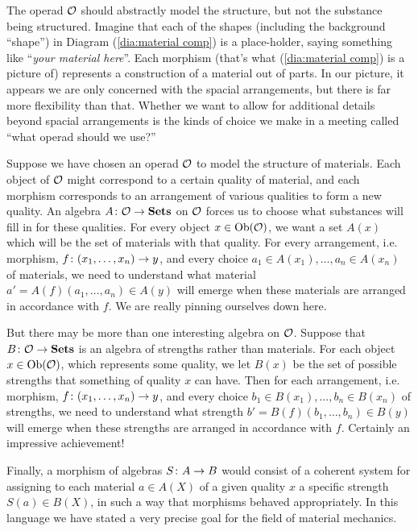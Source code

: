 \documentclass[CT4S-EN-RU]{subfiles}
\begin{document}
\begin{applicationENG}
The operad $\mathcal{O}$ should abstractly model the structure, but not the substance being structured. Imagine that each of the shapes (including the background “shape”) in Diagram (\ref{dia:material comp}) is a place-holder, saying something like “{\em your material here}”. Each morphism (that's what (\ref{dia:material comp}) is a picture of) represents a construction of a material out of parts. In our picture, it appears we are only concerned with the spacial arrangements, but there is far more flexibility than that. Whether we want to allow for additional details beyond spacial arrangements is the kinds of choice we make in a meeting called “what operad should we use?” 
\end{applicationENG}

\begin{applicationRUS}
\end{applicationRUS}

\begin{applicationENG}
Suppose we have chosen an operad $\mathcal{O}$ to model the structure of materials. Each object of $\mathcal{O}$ might correspond to a certain quality of material, and each morphism corresponds to an arrangement of various qualities to form a new quality. An algebra $A\colon\mathcal{O}\rightarrow{\mathbf{Sets}}$ on $\mathcal{O}$ forces us to choose what substances will fill in for these qualities. For every object $x\in\textnormal{Ob}(\mathcal{O})$, we want a set $A(x)$ which will be the set of materials with that quality. For every arrangement, i.e. morphism, $f\colon (x_1,\ldots,x_n)\rightarrow y$, and every choice $a_1\in A(x_1), \ldots, a_n\in A(x_n)$ of materials, we need to understand what material $a'=A(f)(a_1,\ldots,a_n)\in A(y)$ will emerge when these materials are arranged in accordance with $f$. We are really pinning ourselves down here.

But there may be more than one interesting algebra on $\mathcal{O}$. Suppose that $B\colon\mathcal{O}\rightarrow{\mathbf{Sets}}$ is an algebra of strengths rather than materials. For each object $x\in\textnormal{Ob}(\mathcal{O})$, which represents some quality, we let $B(x)$ be the set of possible strengths that something of quality $x$ can have. Then for each arrangement, i.e. morphism, $f\colon (x_1,\ldots,x_n)\rightarrow y$, and every choice $b_1\in B(x_1), \ldots, b_n\in B(x_n)$ of strengths, we need to understand what strength $b'=B(f)(b_1,\ldots,b_n)\in B(y)$ will emerge when these strengths are arranged in accordance with $f$. Certainly an impressive achievement!

Finally, a morphism of algebras $S\colon A\rightarrow B$ would consist of a coherent system for assigning to each material $a\in A(X)$ of a given quality $x$ a specific strength $S(a)\in B(X)$, in such a way that morphisms behaved appropriately. In this language we have stated a very precise goal for the field of material mechanics.
\end{applicationENG}
\end{document}
